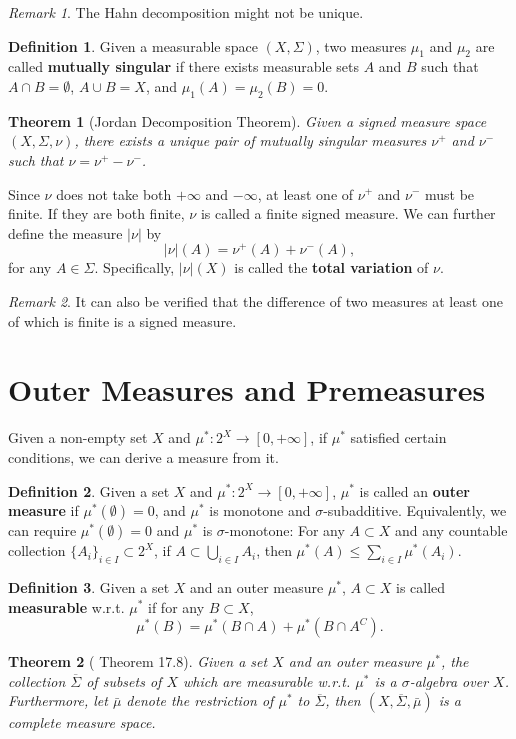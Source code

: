\documentclass[openany]{book}
\newtheorem{theorem}{Theorem}[chapter]
\theoremstyle{definition}
\newtheorem{definition}{Definition}[chapter]
\theoremstyle{remark}
\newtheorem*{remark}{Remark}
\begin{document}
\begin{remark}
    The Hahn decomposition might not be unique.
\end{remark}
\begin{definition}
    Given a measurable space $(X,\Sigma)$, two measures $\mu_1$ and $\mu_2$ are called \textbf{mutually singular} if there exists measurable sets $A$ and $B$ such that $A\cap B=\emptyset$, $A\cup B=X$, and $\mu_1(A)=\mu_2(B)=0$.
\end{definition}
\begin{theorem}[Jordan Decomposition Theorem]
    Given a signed measure space $(X,\Sigma,\nu)$, there exists a unique pair of mutually singular measures $\nu^+$ and $\nu^-$ such that $\nu=\nu^+-\nu^-$.
\end{theorem}
Since $\nu$ does not take both $+\infty$ and $-\infty$, at least one of $\nu^+$ and $\nu^-$ must be finite. If they are both finite, $\nu$ is called a finite signed measure. We can further define the measure $|\nu|$ by
\begin{equation*}
    |\nu|(A)=\nu^+(A)+\nu^-(A),
\end{equation*}
for any $A\in\Sigma$. Specifically, $|\nu|(X)$ is called the \textbf{total variation} of $\nu$.
\begin{remark}
    It can also be verified that the difference of two measures at least one of which is finite is a signed measure.
\end{remark}

\section{Outer Measures and Premeasures}
Given a non-empty set $X$ and $\mu^*:2^X\to[0,+\infty]$, if $\mu^*$ satisfied certain conditions, we can derive a measure from it.
\begin{definition}
    Given a set $X$ and $\mu^*:2^X\to[0,+\infty]$, $\mu^*$ is called an \textbf{outer measure} if $\mu^*(\emptyset)=0$, and $\mu^*$ is monotone and $\sigma$-subadditive. Equivalently, we can require $\mu^*(\emptyset)=0$ and $\mu^*$ is $\sigma$-monotone: For any $A\subset X$ and any countable collection $\{A_i\}_{i\in I}\subset 2^X$, if $A\subset\bigcup_{i\in I}A_i$, then $\mu^*(A)\le \sum_{i\in I}^{}\mu^*(A_i)$.
\end{definition}
\begin{definition}
    Given a set $X$ and an outer measure $\mu^*$, $A\subset X$ is called \textbf{measurable} w.r.t. $\mu^*$ if for any $B\subset X$,
    \begin{equation*}
        \mu^*(B)=\mu^*(B\cap A)+\mu^*(B\cap A^C).
    \end{equation*}
\end{definition}
\begin{theorem}[\cite{RF88} Theorem 17.8]
    Given a set $X$ and an outer measure $\mu^*$, the collection $\overline{\Sigma}$ of subsets of $X$ which are measurable w.r.t. $\mu^*$ is a $\sigma$-algebra over $X$. Furthermore, let $\bar{\mu}$ denote the restriction of $\mu^*$ to $\overline{\Sigma}$, then $(X,\overline{\Sigma},\bar{\mu})$ is a complete measure space.
\end{theorem}
\end{document}
